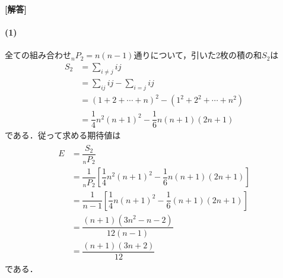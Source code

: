 \documentclass[../../main.tex]{subfiles}
\begin{document}
\begin{oframed}
  
\end{oframed}

{\bf [解答]}
\paragraph{(1)}

全ての組み合わせ${}_nP_2=n(n-1)$通りについて，引いた2枚の積の和$S_2$は
\begin{align}
  S_2
  &= \sum_{i\neq j} ij \\
  &= \sum_{ij} ij - \sum_{i=j} ij \\
  &= (1+2+\cdots + n)^2 - \left(1^2+2^2+\cdots+n^2\right) \\
  &=\dfrac{1}{4}n^2(n+1)^2-\dfrac{1}{6}n(n+1)(2n+1)
\end{align}
である．従って求める期待値は
\begin{align}
  \begin{split}
    E
    &=\dfrac{S_2}{{}_nP_2} \\
    &=\dfrac{1}{{}_nP_2}\left[\dfrac{1}{4}n^2(n+1)^2-\dfrac{1}{6}n(n+1)(2n+1)\right] \\
    &=\dfrac{1}{n-1}\left[\dfrac{1}{4}n(n+1)^2-\dfrac{1}{6}(n+1)(2n+1)\right] \\
    &=\dfrac{(n+1)(3n^2-n-2)}{12(n-1)} \\
    &=\dfrac{(n+1)(3n+2)}{12}
  \end{split}
\end{align}
である．
\end{document}
